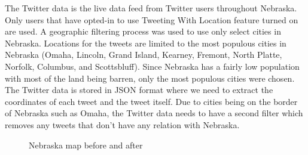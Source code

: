 \documentclass[journal]{vgtc}                %
\begin{document}
The Twitter data is the live data feed from Twitter users throughout Nebraska. Only users that have opted-in to use Tweeting With Location feature turned on are used. A geographic filtering process was used to use only select cities in Nebraska. Locations for the tweets are limited to the most populous cities in Nebraska (Omaha, Lincoln, Grand Island, Kearney, Fremont, North Platte, Norfolk, Columbus, and Scottsbluff). Since Nebraska has a fairly low population with most of the land being barren, only the most populous cities were chosen. The Twitter data is stored in JSON format where we need to extract the coordinates of each tweet and the tweet itself. Due to cities being on the border of Nebraska such as Omaha, the Twitter data needs to have a second filter which removes any tweets that don't have any relation with Nebraska.
\begin{figure}[htp]
  \centering
  \quad
\caption{Nebraska map before and after}
\label{main figure label}
\end{figure}
\end{document}

